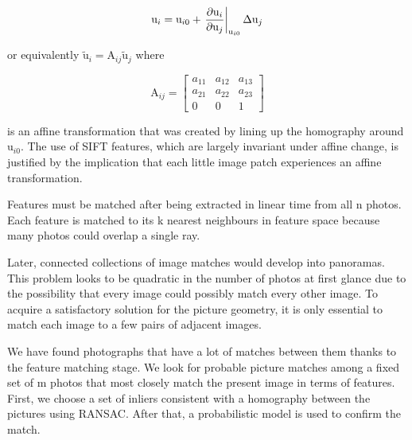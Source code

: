 \documentclass[conference]{IEEEtran}
\begin{document}
\[ \mathrm{u}_i = \mathrm{u}_{i0} + \eval{\pdv{\mathrm{u}_i}{\mathrm{u}_j}}_{\mathrm{u}_{i0}}\Delta\mathrm{u}_j\]

or equivalently \( \mathrm{\tilde{u}}_i = \mathrm{A}_{ij}\mathrm{\tilde{u}}_j \) where 

\[ \mathrm{A}_{ij} = \begin{bmatrix}
a_{11} & a_{12} & a_{13}\\
a_{21} & a_{22} & a_{23}\\
0 & 0 & 1
\end{bmatrix} \]

is an affine transformation that was created by lining up the homography around \(  \mathrm{u}_{i0} \). The use of SIFT features, which are largely invariant under affine change, is justified by the implication that each little image patch experiences an affine transformation.

Features must be matched after being extracted in linear time from all n photos. Each feature is matched to its k nearest neighbours in feature space because many photos could overlap a single ray.

Later, connected collections of image matches would develop into panoramas. This problem looks to be quadratic in the number of photos at first glance due to the possibility that every image could possibly match every other image. To acquire a satisfactory solution for the picture geometry, it is only essential to match each image to a few pairs of adjacent images.

We have found photographs that have a lot of matches between them thanks to the feature matching stage. We look for probable picture matches among a fixed set of m photos that most closely match the present image in terms of features. First, we choose a set of inliers consistent with a homography between the pictures using RANSAC. After that, a probabilistic model is used to confirm the match.
\end{document}
